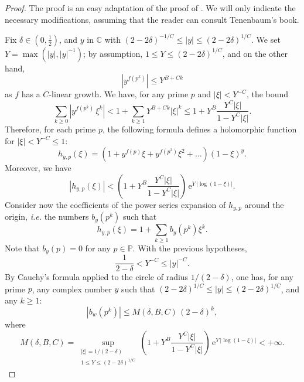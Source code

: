 \documentclass[12pt,a4paper,reqno]{amsart}
\theoremstyle{remark}
\newcommand{\C}{\mathbb{C}}
\newcommand{\E}{\mathrm{e}}
\begin{document}
\begin{proof}
The proof is an easy adaptation of the proof of \cite[Section II.6, Theorems 1 and 2]{Ten95}. We will only indicate the necessary modifications, assuming that the reader can consult Tenenbaum's book.\medskip

Fix $\delta\in(0,\frac{1}{2})$, and $y$ in $\C$ with $(2-2\delta)^{-1/C} \le |y| \le (2-2\delta)^{1/C}$. We set $Y = \max(|y|,|y|^{-1})$; by assumption, $1\leq Y\leq (2-2\delta)^{1/C}$, and on the other hand,
$$|y^{f(p^k)}| \leq Y^{B+Ck}
$$
as $f$ has a $C$-linear growth. We have, for any prime $p$ and $|\xi|<Y^{-C}$, the bound
\[\sum_{k \ge 0} |y^{f(p^k)}\, \xi^k| < 1+\sum_{k \ge 1} Y^{B+Ck} |\xi|^k \leq 1+ Y^B \frac{Y^C |\xi|}{1-Y^C |\xi|}.
\]
Therefore, for each prime $p$, the following formula defines a holomorphic function for $|\xi|<Y^{-C}\leq 1$:
\[h_{y,p}(\xi)= \left( 1+ y^{f(p)} \xi+ y^{f(p^2)} \xi^2 +\dots \right) \left( 1- \xi \right)^y. \]
Moreover, we have
\[|h_{y,p}(\xi)| < \left(1+ Y^B \frac{Y^C |\xi|}{1-Y^C |\xi|} \right)\,\E^{Y\,|\log(1-\xi)|}.\]
Consider now the coefficients of the power series expansion of $h_{y,p}$ around the origin,
{\em i.e.} the numbers $b_y(p^k)$ such that
\[h_{y,p}(\xi)= 1 + \sum_{k \ge 1} b_y(p^k) \xi^k.\]
Note that $b_y(p)=0$ for any $p \in \mathbb{P}$. With the previous hypotheses, 
$$\frac{1}{2-\delta}< Y^{-C}\leq |y|^{-C}.$$
By Cauchy's formula applied to the circle of radius $1/(2-\delta)$, one has, for any prime $p$, any complex number $y$ such that $(2-2\delta)^{1/C}\le |y| \le (2-2\delta)^{1/C}$, and any $k \ge 1$:
\[ |b_w(p^k)| \le M(\delta,B,C)\, (2-\delta)^k, \]
where 
\[M(\delta,B,C) = \sup_{\substack{|\xi| = 1/(2-\delta) \\  1 \leq Y \leq  (2-2\delta)^{1/C} }}
\left(1+ Y^B \frac{Y^C |\xi|}{1-Y^C |\xi|} \right)\,\E^{Y\,|\log(1-\xi)|} < +\infty. \]


\end{proof}
\end{document}
